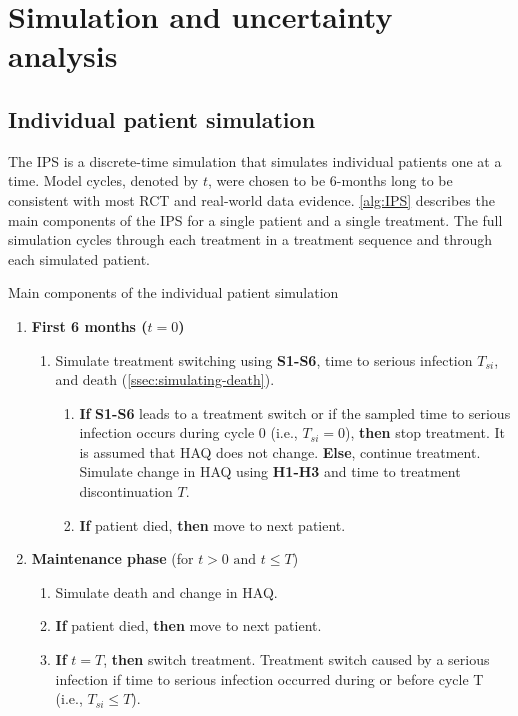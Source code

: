 \documentclass[11pt,final,fleqn]{article}\usepackage[]{graphicx}\usepackage[]{color}
\theoremstyle{plain}
\begin{document}
\section{Simulation and uncertainty analysis}\label{sec:sim-uncertainty}

\subsection{Individual patient simulation}\label{individual-patient-simulation}

The IPS is a discrete-time simulation that simulates individual patients one at a time. Model cycles, denoted by $t$, were chosen to be 6-months long to be consistent with most RCT and real-world data evidence. \autoref{alg:IPS} describes the main components of the IPS for a single patient and a single treatment. The full simulation cycles through each treatment in a treatment sequence and through each simulated patient.

\begin{algorithm}
\caption{Main components of the individual patient simulation}
\label{alg:IPS}
\begin{enumerate}
\item \textbf{First 6 months ($t = 0$)}
\begin{enumerate}
\item Simulate treatment switching using \textbf{S1-S6}, time to serious infection $T_{si}$, and death (\autoref{ssec:simulating-death}).
\begin{enumerate}
\item \textbf{If} \textbf{S1-S6} leads to a treatment switch or if the sampled time to serious infection occurs during cycle 0 (i.e., $T_{si} = 0$), \textbf{then} stop treatment. It is assumed that HAQ does not change.
\newline \textbf{Else}, continue treatment. Simulate change in HAQ using \textbf{H1-H3} and time to treatment discontinuation $T$.
\item \textbf{If} patient died, \textbf{then} move to next patient. 
\end{enumerate}
\end{enumerate}
\item \textbf{Maintenance phase} (for $t > 0 \text{ and } t \leq T$)
\begin{enumerate}
\item Simulate death and change in HAQ.
\item \textbf{If} patient died, \textbf{then} move to next patient.
\item \textbf{If} $t = T$, \textbf{then} switch treatment. Treatment switch caused by a serious infection if time to serious infection occurred during or before cycle T (i.e., $T_{si} \leq T$). 
\end{enumerate}
\end{enumerate}
\end{algorithm}
\end{document}
